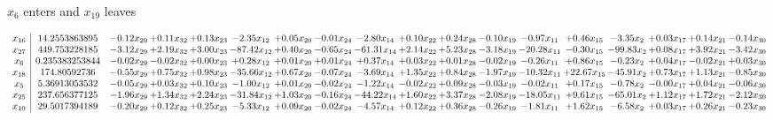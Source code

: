 \documentclass[9pt]{article}
\begin{document}
 $ x_{6} $ enters and $ x_{19} $ leaves 

 \[\begin{array}{c| c c@{\hskip 2pt} c@{\hskip 2pt} c@{\hskip 2pt} c@{\hskip 2pt} c@{\hskip 2pt} c@{\hskip 2pt} c@{\hskip 2pt} c@{\hskip 2pt} c@{\hskip 2pt} c@{\hskip 2pt} c@{\hskip 2pt} c@{\hskip 2pt} c@{\hskip 2pt} c@{\hskip 2pt} c@{\hskip 2pt} c@{\hskip 2pt} }
 x_{16}   &  14.2553863895 & -0.12 x_{29} & +  0.11 x_{32} & +  0.13 x_{23} & -2.35 x_{12} & +  0.05 x_{20} & -0.01 x_{24} & -2.80 x_{14} & +  0.10 x_{22} & +  0.24 x_{28} & -0.10 x_{19} & -0.97 x_{11} & +  0.46 x_{15} & -3.35 x_{2} & +  0.03 x_{17} & +  0.14 x_{21} & -0.14 x_{30}\\
 x_{27}   &  449.753228185 & -3.12 x_{29} & +  2.19 x_{32} & +  3.00 x_{23} & -87.42 x_{12} & +  0.40 x_{20} & -0.65 x_{24} & -61.31 x_{14} & +  2.14 x_{22} & +  5.23 x_{28} & -3.18 x_{19} & -20.28 x_{11} & -0.30 x_{15} & -99.83 x_{2} & +  0.08 x_{17} & +  3.92 x_{21} & -3.42 x_{30}\\
 x_{6}   &  0.235383253844 & -0.02 x_{29} & -0.02 x_{32} & +  0.00 x_{23} & +  0.28 x_{12} & +  0.01 x_{20} & +  0.01 x_{24} & +  0.37 x_{14} & +  0.03 x_{22} & +  0.01 x_{28} & -0.02 x_{19} & -0.26 x_{11} & +  0.86 x_{15} & -0.23 x_{2} & +  0.04 x_{17} & -0.02 x_{21} & +  0.03 x_{30}\\
 x_{18}   &  174.80592736 & -0.55 x_{29} & +  0.75 x_{32} & +  0.98 x_{23} & -35.66 x_{12} & +  0.67 x_{20} & -0.07 x_{24} & -3.69 x_{14} & +  1.35 x_{22} & +  0.84 x_{28} & -1.97 x_{19} & -10.32 x_{11} & + 22.67 x_{15} & -45.91 x_{2} & +  0.73 x_{17} & +  1.13 x_{21} & -0.85 x_{30}\\
 x_{5}   &  5.36913053532 & -0.05 x_{29} & +  0.03 x_{32} & +  0.10 x_{23} & -1.00 x_{12} & +  0.01 x_{20} & -0.02 x_{24} & -1.22 x_{14} & -0.02 x_{22} & +  0.09 x_{28} & -0.03 x_{19} & -0.02 x_{11} & +  0.17 x_{15} & -0.78 x_{2} & -0.00 x_{17} & +  0.04 x_{21} & -0.06 x_{30}\\
 x_{25}   &  237.656377125 & -1.96 x_{29} & +  1.34 x_{32} & +  2.24 x_{23} & -31.84 x_{12} & +  1.03 x_{20} & -0.16 x_{24} & -44.22 x_{14} & +  1.60 x_{22} & +  3.37 x_{28} & -2.08 x_{19} & -18.05 x_{11} & +  9.61 x_{15} & -65.01 x_{2} & +  1.12 x_{17} & +  1.72 x_{21} & -2.12 x_{30}\\
 x_{10}   &  29.5017394189 & -0.20 x_{29} & +  0.12 x_{32} & +  0.25 x_{23} & -5.33 x_{12} & +  0.09 x_{20} & -0.02 x_{24} & -4.57 x_{14} & +  0.12 x_{22} & +  0.36 x_{28} & -0.26 x_{19} & -1.81 x_{11} & +  1.62 x_{15} & -6.58 x_{2} & +  0.03 x_{17} & +  0.26 x_{21} & -0.23 x_{30}\\

\end{array}\]
\end{document}
